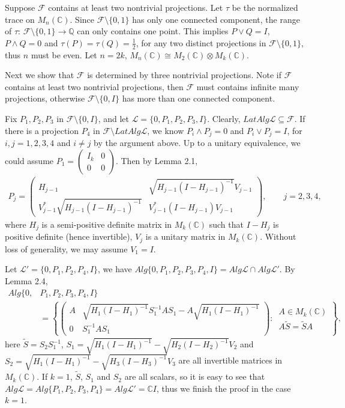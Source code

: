 \documentclass[12pt]{article}
\newcommand{\LLL}{\mathcal L} %
\newcommand{\FFF}{\mathcal F}
\newcommand{\C}{\mathbb C} %
\newcommand{\Q}{\mathbb Q} %
\def\L{{\mathcal{L}}}
\begin{document}
{\quad  Suppose $\FFF$ contains at least two
nontrivial projections. Let $\tau$ be the normalized trace on $M_{n}(\C)$. Since  $\FFF \setminus \{0, 1 \}$ has only
one connected component, the range of $\tau$: $\FFF \setminus \{0, 1 \} \rightarrow \Q$ can only contains one point.
This implies $P\vee Q=I$, $P\wedge Q=0$ and $\tau(P)=\tau(Q)=\frac12$, for any two distinct projections in $\FFF \setminus \{0, 1 \}$, thus $n$ must be even. Let $n=2k$, $M_n(\C) \cong M_2(\C)\otimes M_k(\C)$.

Next we show that $\FFF$ is determined by three nontrivial
projections. Note if $\FFF$ contains at least two nontrivial projections, then $\FFF$ must contains infinite many projections, otherwise $\FFF \setminus \{0,I\}$ has more than one connected component. 

Fix $P_1,P_2,P_3$ in $\FFF\setminus\{0,I\}$, and let
$\L=\{0,P_1,P_2,P_3,I\}$. Clearly, $LatAlg\LLL\subseteq\FFF$.
If there is a projection $P_4$
in $\FFF \setminus LatAlg\LLL$, we
know $P_i\wedge P_j=0$ and $P_i\vee P_j=I$,
for $i,j=1,2,3,4$ and $i\neq j$ by the argument above. Up to a unitary equivalence, we could assume $P_1=\left(\begin{array}{cc}  I_k & 0\\
0 &0\end{array}\right)$. Then by Lemma 2.1,
\begin{align*}
P_j=\left(\begin{array}{cc} H_{j-1} &
\sqrt{H_{j-1}(I-H_{j-1})^{-1}}V_{j-1}\\
V_{j-1}^{*}\sqrt{H_{j-1}(I-H_{j-1})^{-1}} &
V_{j-1}^{*}(I-H_{j-1})V_{j-1}\end{array}\right), 
\qquad j=2,3,4,
\end{align*}
where $H_j$ is a semi-positive definite matrix in
$M_k(\C)$ such that $I-H_j$ is positive definite (hence
invertible), $V_j$ is a unitary matrix in $M_k(\C)$. Without loss of generality, we may assume $V_1=I$.

Let $\L'=\{0,P_1,P_2,P_4,I\}$, we have $ Alg\{0,P_1,P_2,P_3,P_4,I\}=
Alg\L\cap Alg\L'$. By Lemma 2.4, 
\begin{align*}
 Alg\{0,&P_1,P_2,P_3,P_4,I\}\\ 
 &=\left\{\left(\begin{array}{cc} A & \sqrt{H_1(I-H_1)^{-1}}S_1^{-1}AS_1-A\sqrt{H_1(I-H_1)^{-1}}\\
0 & S_1^{-1}AS_1\end{array}\right):\, \begin{array}{l} A\in M_k(\C)\\
A\widetilde{S}=\widetilde{S}A\end{array}\right\},
\end{align*}
here
$\widetilde{S}=S_2S_1^{-1}$,
$S_1=\sqrt{H_1(I-H_1)^{-1}}-\sqrt{H_2(I-H_2)^{-1}}V_2$ and 
$S_2=\sqrt{H_1(I-H_1)^{-1}}-\sqrt{H_3(I-H_3)^{-1}}V_3$ are all
invertible matrices in $M_k(\C)$. If $k = 1$, $\widetilde{S}$, $S_1$ and $S_2$ are all scalars, so it is easy to see that $Alg\L=Alg\{P_1,P_2,P_3,P_4\}= Alg\L'= \C I$, thus we finish the proof in the case $k = 1$.

}
\end{document}

